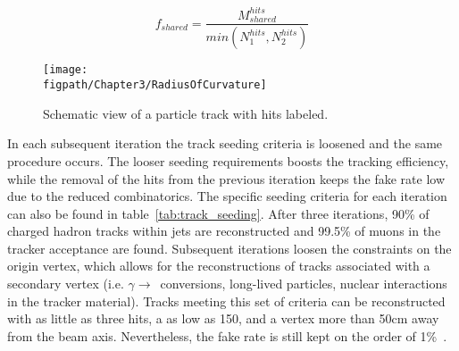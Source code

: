\begin{equation}
\label{eq:trajectory_cleaning}
f_{shared}=\frac{M^{hits}_{shared}}{min\left(N^{hits}_{1},N^{hits}_{2}\right)}
\end{equation}

\begin{figure}[!hbt]
    \centering
    \texttt{[image: \\figpath/Chapter3/RadiusOfCurvature]}
    \caption{Schematic view of a particle track with hits labeled.}
    \label{fig:radius_of_curvature}
\end{figure}

In each subsequent iteration the track seeding criteria is loosened and the same procedure occurs.
The looser seeding requirements boosts the tracking efficiency, while the removal of the hits from the previous iteration keeps the fake rate low due to the reduced combinatorics.
The specific seeding criteria for each iteration can also be found in table~\ref{tab:track_seeding}.
After three iterations, 90\% of charged hadron tracks within jets are reconstructed and 99.5\% of muons in the tracker acceptance are found.
Subsequent iterations loosen the constraints on the origin vertex, which allows for the reconstructions of tracks associated with a secondary vertex (i.e. $\gamma\rightarrow$\Pep\Pem~conversions, long-lived particles, nuclear interactions in the tracker material).
Tracks meeting this set of criteria can be reconstructed with as little as three hits, a \pt as low as 150\mev, and a vertex  more than 50\unit{cm} away from the beam axis.
Nevertheless, the fake rate is still kept on the order of 1\%~\cite{CMS-PAS-PFT-09-001}.

